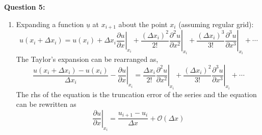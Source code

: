 \documentclass[12pts,a4paper,amsmath,amssymb,floatfix]{article}%
\newcommand{\frc}{\displaystyle\frac}
\begin{document}
\clearpage

\begin{flushleft}
{\bf Question 5:}
\end{flushleft}
\begin{enumerate}
\item  Expanding a function $\underline{u}$ at $x_{i+1}$ about the point $x_{i}$ (assuming regular grid):
\begin{displaymath}
u\left(x_{i}+\Delta x_{i}\right) = u\left(x_{i}\right) + \Delta x_{i}\left.\frc{\partial u}{\partial x}\right|_{x_{i}} + \frc{\left(\Delta x_{i}\right)^{2}}{2!}\left.\frc{\partial^{2}u}{\partial x^{2}}\right|_{x_{i}} + \frc{\left(\Delta x_{i}\right)^{3}}{3!}\left.\frc{\partial^{3}u}{\partial x^{3}}\right|_{x_{i}} + \cdots 
\end{displaymath}
The Taylor's expansion can be rearranged as,
\begin{displaymath}
\frc{u\left(x_{i}+\Delta x_{i}\right)-u\left(x_{i}\right)}{\Delta x_{i}} - \left.\frc{\partial u}{\partial x}\right|_{x_{i}} = \frc{\Delta x_{i}}{2!}\left.\frc{\partial^{2}u}{\partial x^{2}}\right|_{x_{i}} + \frc{\left(\Delta x_{i}\right)^{2}}{3!}\left.\frc{\partial^{3}u}{\partial x^{3}}\right|_{x_{i}} + \cdots 
\end{displaymath}
The rhs of the equation is the truncation error of the series and the equation can be rewritten as
\begin{displaymath}
\left.\frc{\partial u}{\partial x}\right|_{x_{i}} = \frc{u_{i+1}-u_{i}}{\Delta x} + \mathcal{O}\left(\Delta x\right)
\end{displaymath}


\end{enumerate}
\end{document}
